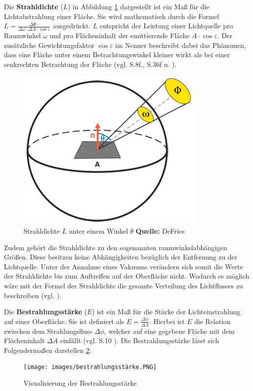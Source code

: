 \documentclass[
  11pt,
  a4paper,
  oneside
  ]{article}
\begin{document}
Die \textbf{Strahldichte} ($L$) in Abbildung \ref{fig:img4} dargestellt ist ein Maß für die Lichtabstrahlung einer Fläche. Sie wird mathematisch durch die Formel $ L=\tfrac{\Delta \Phi \cdot }{\Delta \omega \cdot \Delta A\cdot \cos \varepsilon } $ ausgedrückt. $L$ entspricht der Leistung einer Lichtquelle pro Raumwinkel $\omega$ und pro Flächeninhalt der emittierende Fläche $A\cdot \cos \varepsilon$. Der zusätzliche Gewichtungsfaktor $\cos \varepsilon$ im Nenner beschreibt dabei das Phänomen, dass eine Fläche unter einem Betrachtungswinkel kleiner wirkt als bei einer senkrechten Betrachtung der Fläche 
(vgl. S.8f.\cite{GrundlagenLichtTechnik}, S.36f \cite{radiometrischeGrundbegriffe} u. \cite{vgb,learnOpenGL}).
\begin{figure}[H]
  \centering
  \includegraphics*[width=0.34 \linewidth]{images/radiance.png}
  \caption{Strahldichte $L$ unter einem Winkel $\theta$ \footnotesize\textbf{Quelle:} DeFries\cite{learnOpenGL}}
  \label{fig:img4}
\end{figure}
Zudem gehört die Strahldichte zu den sogenannten raumwinkelabhängigen Größen. Diese besitzen keine Abhängigkeiten bezüglich der Entfernung zu der Lichtquelle. Unter der Annahme eines Vakuums verändern sich somit die Werte der Strahldichte bis zum Auftreffen auf der Oberfläche nicht. Wodurch es möglich wäre mit der Formel der Strahldichte die gesamte Verteilung des Lichtflusses zu beschreiben
(vgl. \cite{gMueller}). 

Die \textbf{Bestrahlungsstärke} ($E$) ist ein Maß für die Stärke der Lichteinstrahlung auf einer Oberfläche. Sie ist definiert als $E=\tfrac{\Delta \phi}{\Delta A}$. Hierbei ist $E$ die Relation zwischen dem Strahlungsfluss $\Delta \phi$, welcher auf eine gegebene Fläche mit dem Flächeninhalt $\Delta A$ einfällt 
(vgl. S.10 \cite{GrundlagenLichtTechnik}). Die Bestrahlungsstärke lässt sich Folgendermaßen darstellen \ref{fig:bestrahlungsstaerke}:
\begin{figure}[H]
    \centering
    \texttt{[image: images/bestrahlungsstärke.PNG]}
    \caption{Visualisierung der Bestrahlungsstärke}
    \label{fig:bestrahlungsstaerke}
\end{figure}
\end{document}
